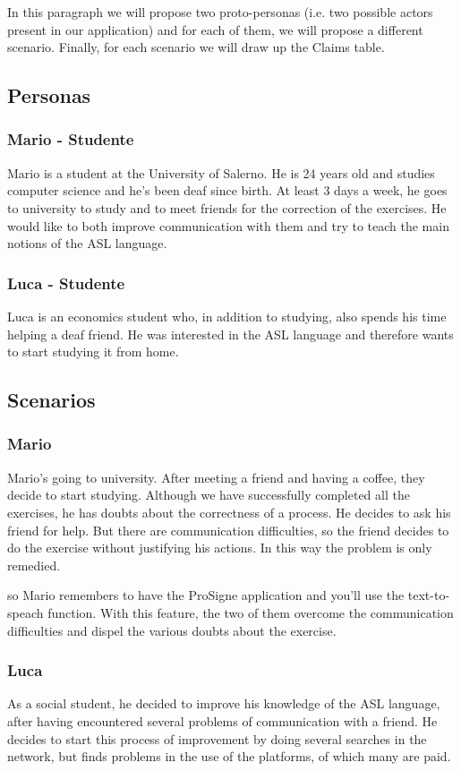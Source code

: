 \lhead{}
In this paragraph we will propose two proto-personas (i.e. two possible actors present in our application) and for each of them, we will propose a different scenario. Finally, for each scenario we will draw up the Claims table.

\subsection{Personas}
\subsubsection{Mario - Studente}
Mario is a student at the University of Salerno. He is 24 years old and studies computer science and he's been deaf since birth. At least 3 days a week, he goes to university to study and to meet friends for the correction of the exercises. He would like to both improve communication with them and try to teach the main notions of the ASL language.

\subsubsection{Luca - Studente}
Luca is an economics student who, in addition to studying, also spends his time helping a deaf friend. He was interested in the ASL language and therefore wants to start studying it from home. 

\subsection{Scenarios}
\subsubsection{Mario}
Mario's going to university. After meeting a friend and having a coffee, they decide to start studying. Although we have successfully completed all the exercises, he has doubts about the correctness of a process. He decides to ask his friend for help.  But there are communication difficulties, so the friend decides to do the exercise without justifying his actions. In this way the problem is only remedied.

so Mario remembers to have the ProSigne application and you'll use the text-to-speach function. With this feature, the two of them overcome the communication difficulties and dispel the various doubts about the exercise.

\subsubsection{Luca}
As a social student, he decided to improve his knowledge of the ASL language, after having encountered several problems of communication with a friend. He decides to start this process of improvement by doing several searches in the network, but finds problems in the use of the platforms, of which many are paid. 

